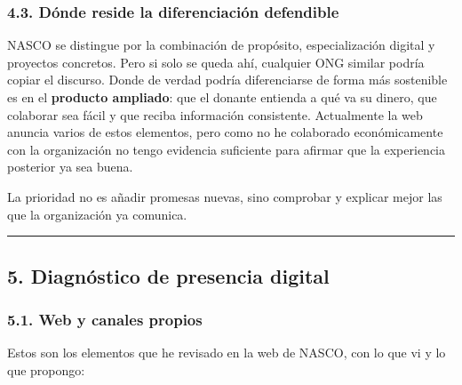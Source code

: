 \documentclass[
]{article}
\begin{document}
\hypertarget{duxf3nde-reside-la-diferenciaciuxf3n-defendible}{%
\subsubsection{4.3. Dónde reside la diferenciación
defendible}\label{duxf3nde-reside-la-diferenciaciuxf3n-defendible}}

NASCO se distingue por la combinación de propósito, especialización
digital y proyectos concretos. Pero si solo se queda ahí, cualquier ONG
similar podría copiar el discurso. Donde de verdad podría diferenciarse
de forma más sostenible es en el \textbf{producto ampliado}: que el
donante entienda a qué va su dinero, que colaborar sea fácil y que
reciba información consistente. Actualmente la web anuncia varios de
estos elementos, pero como no he colaborado económicamente con la
organización no tengo evidencia suficiente para afirmar que la
experiencia posterior ya sea buena.

La prioridad no es añadir promesas nuevas, sino comprobar y explicar
mejor las que la organización ya comunica.

\begin{center}\rule{0.5\linewidth}{0.5pt}\end{center}

\hypertarget{diagnuxf3stico-de-presencia-digital}{%
\subsection{5. Diagnóstico de presencia
digital}\label{diagnuxf3stico-de-presencia-digital}}

\hypertarget{web-y-canales-propios}{%
\subsubsection{5.1. Web y canales propios}\label{web-y-canales-propios}}

Estos son los elementos que he revisado en la web de NASCO, con lo que
vi y lo que propongo:
\end{document}
